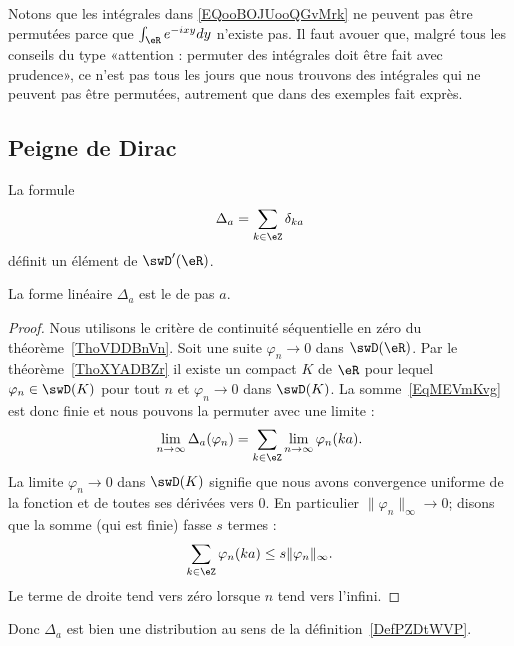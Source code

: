 \begin{normaltext}
    Notons que les intégrales dans \eqref{EQooBOJUooQGvMrk} ne peuvent pas être permutées parce que \( \int_{\eR} e^{-ixy}dy\) n'existe pas. Il faut avouer que, malgré tous les conseils du type «attention : permuter des intégrales doit être fait avec prudence», ce n'est pas tous les jours que nous trouvons des intégrales qui ne peuvent pas être permutées, autrement que dans des exemples fait exprès.
\end{normaltext}

\subsection{Peigne de Dirac}

\begin{proposition}
    La formule
    \begin{equation}    \label{EqMEVmKvg}
        \Delta_a=\sum_{k\in \eZ}\delta_{ka}
    \end{equation}
    définit un élément de \( \swD'(\eR)\).
\end{proposition}
La forme linéaire \( \Delta_a\) est le  de pas \( a\).

\begin{proof}
    Nous utilisons le critère de continuité séquentielle en zéro du théorème~\ref{ThoVDDBnVn}. Soit une suite \( \varphi_n\to 0\) dans \( \swD(\eR)\). Par le théorème~\ref{ThoXYADBZr} il existe un compact \( K\) de \( \eR\) pour lequel \( \varphi_n\in\swD(K)\) pour tout \( n\) et \( \varphi_n\to0\) dans \( \swD(K)\). La somme~\ref{EqMEVmKvg} est donc finie et nous pouvons la permuter avec une limite :
    \begin{equation}
        \lim_{n\to \infty} \Delta_a(\varphi_n)=\sum_{k\in\eZ}\lim_{n\to \infty} \varphi_n(ka).
    \end{equation}
    La limite \( \varphi_n\to 0\) dans \( \swD(K)\) signifie que nous avons convergence uniforme de la fonction et de toutes ses dérivées vers \( 0\). En particulier \( \| \varphi_n \|_{\infty}\to 0\); disons que la somme (qui est finie) fasse \( s\) termes :
    \begin{equation}
        \sum_{k\in \eZ}\varphi_n(ka)\leq s\| \varphi_n \|_{\infty}.
    \end{equation}
    Le terme de droite tend vers zéro lorsque \( n\) tend vers l'infini.
\end{proof}
Donc \( \Delta_a\) est bien une distribution au sens de la définition~\ref{DefPZDtWVP}.

